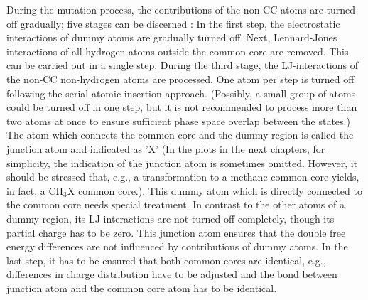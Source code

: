 During the mutation process, the contributions of the non-CC atoms are turned off gradually; five stages can be discerned \cite{Karwounopoulos.2022}:  In the first step, the electrostatic interactions of dummy atoms are gradually turned off. Next, Lennard-Jones interactions of all hydrogen atoms outside the common core are removed. This can be carried out in a single step.
During the third stage, the LJ-interactions of the non-CC non-hydrogen atoms are processed. One atom per step is turned off following the serial atomic insertion approach. (Possibly, a small group of atoms could be turned off in one step, but it is not recommended to process more than two atoms at once to ensure sufficient phase space overlap between the states.)
The atom which connects the common core and the dummy region is  called the junction atom and indicated as 'X' \cite{Karwounopoulos.2022} (In the plots in the next chapters, for simplicity, the indication of the junction atom is sometimes omitted. However, it should be stressed that, e.g., a transformation to a methane common core yields, in fact, a $\mathrm{CH_3X}$ common core.). This dummy atom which is directly connected to the common core needs special treatment. In contrast to the other atoms of a dummy region, its LJ interactions are not turned off completely, though its partial charge has to be zero.\cite{Karwounopoulos.2022} This junction atom ensures that the double free energy differences are not influenced by contributions of dummy atoms.\cite{Fleck.2021}
In the last step, it has to be ensured that both common cores are identical, e.g., differences in charge distribution have to be adjusted and the bond between junction atom and the common core atom has to be identical.

